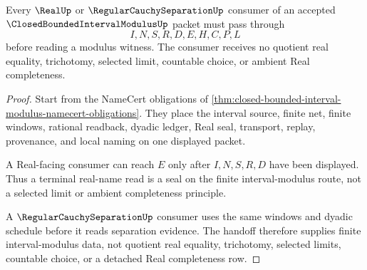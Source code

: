 \begin{theorem}
\label{thm:closed-bounded-interval-modulus-window-handoff}
Every $\RealUp$ or $\RegularCauchySeparationUp$ consumer of an accepted $\ClosedBoundedIntervalModulusUp$ packet must pass through
$$
I,N,S,R,D,E,H,C,P,L
$$
before reading a modulus witness. The consumer receives no quotient real equality, trichotomy, selected limit, countable choice, or ambient Real completeness.
\end{theorem}
\begin{proof}
Start from the NameCert obligations of \autoref{thm:closed-bounded-interval-modulus-namecert-obligations}. They place the interval source, finite net, finite windows, rational readback, dyadic ledger, Real seal, transport, replay, provenance, and local naming on one displayed packet.

A Real-facing consumer can reach $E$ only after $I,N,S,R,D$ have been displayed. Thus a terminal real-name read is a seal on the finite interval-modulus route, not a selected limit or ambient completeness principle.

A $\RegularCauchySeparationUp$ consumer uses the same windows and dyadic schedule before it reads separation evidence. The handoff therefore supplies finite interval-modulus data, not quotient real equality, trichotomy, selected limits, countable choice, or a detached Real completeness row.
\end{proof}




